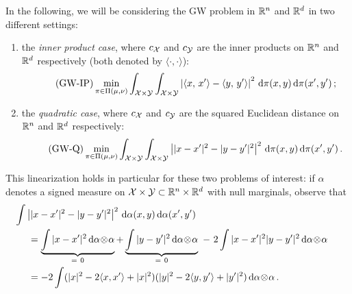         In the following, we will be considering the GW problem in $\mathbb{R}^n$ and $\mathbb{R}^d$ in two different settings:
        \begin{enumerate}[label=(\roman*),noitemsep]
            \item the \emph{inner product case}, where $c_{\mathcal{X}}$ and $c_{\mathcal{Y}}$ are the inner products on $\mathbb{R}^n$ and $\mathbb{R}^d$ respectively (both denoted by $\langle \cdot, \cdot \rangle$):
                \begin{equation*}
                    \tag{GW-IP}
                    \min _{\pi \in \Pi(\mu, \nu)} \int_{\mathcal{X}\times\mathcal{Y}}\int_{\mathcal{X}\times\mathcal{Y}}\left|\langle x,\, x'\rangle-\langle y,\, y'\rangle\right|^{2} \,\mathrm d\pi(x, y) \,\mathrm d\pi(x', y')\,;
                    \label{eqn:GW-inner-prod-before}
                \end{equation*}
                \item the \emph{quadratic case}, where $c_{\mathcal{X}}$ and $c_{\mathcal{Y}}$ are the squared Euclidean distance on $\mathbb{R}^n$ and $\mathbb{R}^d$ respectively:
                \begin{equation*}
                    \tag{GW-Q}
                    \min _{\pi \in \Pi(\mu, \nu)} \int_{\mathcal{X}\times\mathcal{Y}}\int_{\mathcal{X}\times\mathcal{Y}}\left||x-x'|^2-|y-y'|^2\right|^{2} \,\mathrm d\pi(x, y) \,\mathrm d\pi(x', y')\,.
                    \label{eqn:GW-quadratic-before}
                \end{equation*}
            \end{enumerate}
        This linearization holds in particular for these two problems of interest: if $\alpha$ denotes a signed measure on $\mathcal{X} \times \mathcal{Y} \subset \mathbb{R}^n \times \mathbb{R}^d$ with null marginals, observe that
        \begin{align*}
            &\hspace{-5mm}\int \left| |x-x'|^2 - |y-y'|^2\right|^2 \dd \alpha(x,y) \dd \alpha(x',y') \\
            &= \underbrace{\int |x-x'|^2 \dd \alpha\! \otimes\! \alpha}_{=\ 0} + \underbrace{\int |y-y'|^2 \dd \alpha\! \otimes\! \alpha}_{=\ 0} \ -\ 2 \int |x-x'|^2 |y-y'|^2 \dd \alpha\! \otimes\! \alpha \\
            & = -2 \int (|x|^2 - 2 \langle x, x' \rangle + |x|^2)(|y|^2 - 2 \langle y , y' \rangle + |y'|^2) \dd \alpha\! \otimes\! \alpha\,.
        \end{align*}

